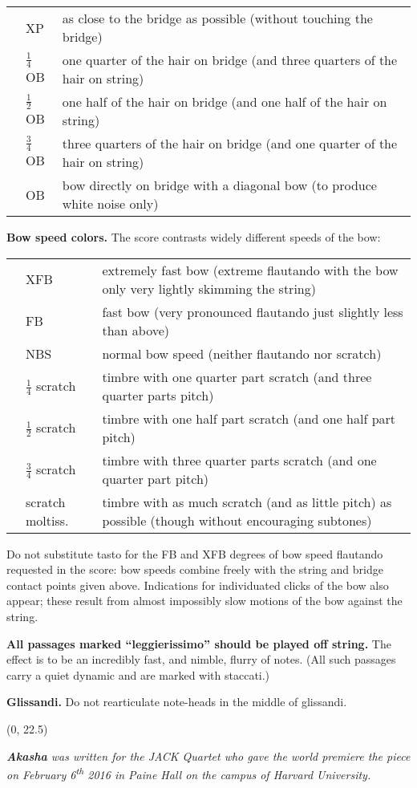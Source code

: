\documentclass[10pt]{article}
\begin{document}
\begin{textblock}{23}
\begin{tabu}{l l l}
\phantom{M} & XP & as close to the bridge as possible (without touching the bridge) \\
            & $\frac{1}{4}$OB & one quarter of the hair on bridge (and three quarters of the hair on string) \\
            & $\frac{1}{2}$OB & one half of the hair on bridge (and one half of the hair on string) \\
            & $\frac{3}{4}$OB & three quarters of the hair on bridge (and one quarter of the hair on string) \\
            & OB & bow directly on bridge with a diagonal bow (to produce white noise only) \\
\end{tabu}

\textbf{Bow speed colors.} The score contrasts widely different speeds of the bow:
 
\begin{tabu}{l l l}
\phantom{M} & XFB & extremely fast bow (extreme flautando with the bow only very lightly skimming the string) \\
            & FB & fast bow (very pronounced flautando just slightly less than above) \\
            & NBS & normal bow speed (neither flautando nor scratch) \\
            & $\frac{1}{4}$ scratch & timbre with one quarter part scratch (and three quarter parts pitch) \\
            & $\frac{1}{2}$ scratch & timbre with one half part scratch (and one half part pitch) \\
            & $\frac{3}{4}$ scratch & timbre with three quarter parts scratch (and one quarter part pitch) \\
            & scratch moltiss. & timbre with as much scratch (and as little pitch) as possible (though without encouraging subtones) \\
\end{tabu}

Do not substitute tasto for the FB and XFB degrees of bow speed flautando
requested in the score: bow speeds combine freely with the string and bridge
contact points given above. Indications for individuated clicks of the bow also
appear; these result from almost impossibly slow motions of the bow against the
string.

\textbf{All passages marked ``leggierissimo'' should be played off string.} The
effect is to be an incredibly fast, and nimble, flurry of notes. (All such
passages carry a quiet dynamic and are marked with staccati.)

\textbf{Glissandi.} Do not rearticulate note-heads in the middle of glissandi.

\end{textblock}

\begin{textblock}{23}(0, 22.5)

\textit{\textbf{Akasha} was written for the JACK Quartet who gave the world premiere
the piece on February 6\textsuperscript{th} 2016 in Paine Hall on the campus of
Harvard University.}

\end{textblock}
\end{document}
